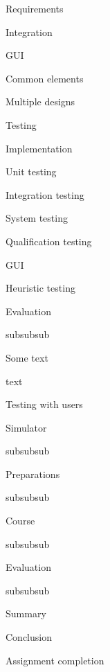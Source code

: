 \secc Requirements


\secc Integration


\sec GUI


\secc Common elements


\secc Multiple designs


\chap Testing


\sec Implementation


\secc Unit testing


\secc Integration testing


\secc System testing


\secc Qualification testing


\sec GUI


\secc Heuristic testing


\secc Evaluation

subsubsub

\par Some text

text


\secc Testing with users


\secc Simulator

subsubsub

\secc Preparations

subsubsub

\secc Course

subsubsub

\secc Evaluation

subsubsub

\sec Summary


\chap Conclusion


\sec Assignment completion


